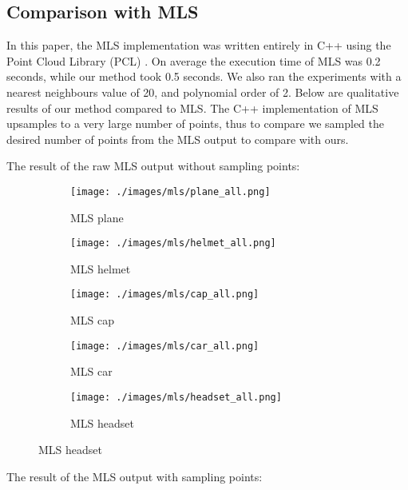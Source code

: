 \subsection{Comparison with MLS}

In this paper, the MLS implementation was written entirely in C++ using the Point Cloud Library (PCL) \cite{pcl}.
On average the execution time of MLS was 0.2 seconds, while our method took 0.5 seconds.
We also ran the experiments with a nearest neighbours value of 20, and polynomial order of 2. 
Below are qualitative results of our method compared to MLS.
The C++ implementation of MLS upsamples to a very large number of points, thus to compare we sampled the desired number of points from the MLS output to compare with ours.

The result of the raw MLS output without sampling points:

\begin{figure}[H]
	\centering
	\begin{subfigure}{0.18\textwidth}
		\texttt{[image: ./images/mls/plane\_all.png]}
		\caption{MLS plane}
	\end{subfigure}
	\begin{subfigure}{0.18\textwidth}
		\texttt{[image: ./images/mls/helmet\_all.png]}
		\caption{MLS helmet}
	\end{subfigure}
	\begin{subfigure}{0.18\textwidth}
		\texttt{[image: ./images/mls/cap\_all.png]}
		\caption{MLS cap}
	\end{subfigure}
	\begin{subfigure}{0.18\textwidth}
		\texttt{[image: ./images/mls/car\_all.png]}
		\caption{MLS car}
	\end{subfigure}
	\begin{subfigure}{0.18\textwidth}
		\texttt{[image: ./images/mls/headset\_all.png]}
		\caption{MLS headset}
	\end{subfigure}
\end{figure}

The result of the MLS output with sampling points:

